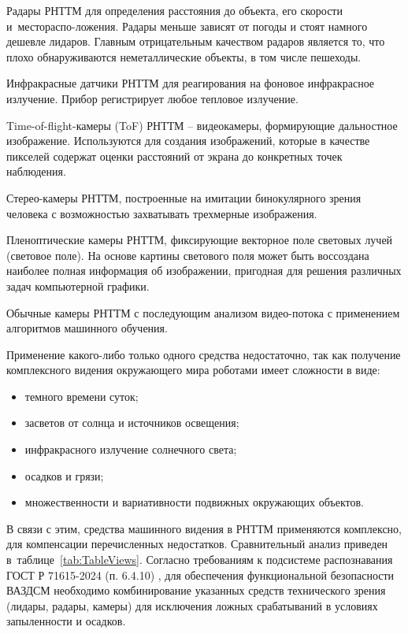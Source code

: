 Радары РНТТМ для определения расстояния до объекта, его скорости и~местораспо-ложения. Радары меньше зависят от погоды и стоят намного дешевле лидаров. Главным отрицательным качеством радаров является то, что плохо обнаруживаются неметаллические объекты, в том числе пешеходы.

Инфракрасные датчики РНТТМ для реагирования на фоновое инфракрасное излучение. Прибор регистрирует любое тепловое излучение.

Time-of-flight-камеры (ToF) РНТТМ -- видеокамеры, формирующие дальностное изображение. Используются для создания изображений, которые в качестве пикселей содержат оценки расстояний от экрана до конкретных точек наблюдения.


Стерео-камеры РНТТМ, построенные на имитации бинокулярного зрения человека с возможностью захватывать трехмерные изображения.

Пленоптические камеры РНТТМ, фиксирующие векторное поле световых лучей (световое поле). На основе картины светового поля может быть воссоздана наиболее полная информация об изображении, пригодная для решения различных задач компьютерной графики.

Обычные камеры РНТТМ с последующим анализом видео-потока с применением алгоритмов машинного обучения.

Применение какого-либо только одного средства недостаточно, так как получение комплексного видения окружающего мира роботами имеет сложности в виде:

\begin{itemize}[beginpenalty=10000, midpenalty=10000, wide=\parindent, leftmargin=0pt]
    \item темного времени суток;
    \item засветов от солнца и источников освещения;
    \item инфракрасного излучение солнечного света;
    \item осадков и грязи;
    \item множественности и вариативности подвижных окружающих объектов.
\end{itemize}

В связи с этим, средства машинного видения в РНТТМ применяются комплексно, для компенсации перечисленных недостатков. Сравнительный анализ приведен в~таблице~\ref{tab:TableViews}. Согласно требованиям к подсистеме распознавания ГОСТ Р 71615-2024 (п. 6.4.10) \cite{gostR71615}, для обеспечения функциональной безопасности ВАЗДСМ необходимо комбинирование указанных средств технического зрения (лидары, радары, камеры) для исключения ложных срабатываний в условиях запыленности и осадков.


